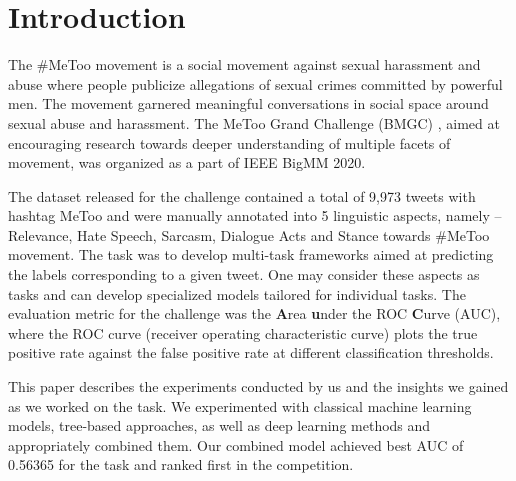 	\section{Introduction}
	
	
	The \#MeToo movement is a social movement against sexual harassment and abuse where people publicize allegations of sexual crimes committed by powerful  men. The movement garnered meaningful conversations in social space around sexual abuse and harassment. The MeToo Grand Challenge (BMGC) \cite{bmgc}, aimed at encouraging research towards deeper understanding of multiple facets of movement, was organized as a part of IEEE BigMM 2020. 
	
 The dataset released for the challenge   \cite{ghosh-chowdhury-etal-2019-youtoo,ghosh-chowdhury-etal-2019-speak,Gautam_Mathur_Gosangi_Mahata_Sawhney_Shah_2020} contained a total of 9,973 tweets with hashtag MeToo and were manually annotated into 5 linguistic aspects, namely --  Relevance, Hate Speech, Sarcasm, Dialogue Acts and Stance towards \#MeToo movement. The task was to develop multi-task frameworks aimed at predicting the labels corresponding to a given tweet. One may consider these aspects as tasks and can develop specialized models tailored for individual tasks. The evaluation metric for the challenge was the \textbf{A}rea \textbf{u}nder the ROC \textbf{C}urve (AUC), where the ROC curve (receiver operating characteristic curve) plots the true positive rate against the false positive rate at different classification thresholds.

This paper describes the experiments conducted by us and the insights we gained as we worked on the task. We experimented with classical machine learning models, tree-based approaches, as well as deep learning methods and appropriately combined them. Our combined model achieved best AUC of 0.56365 for the task and ranked first \cite{leaderboard} in the competition. 